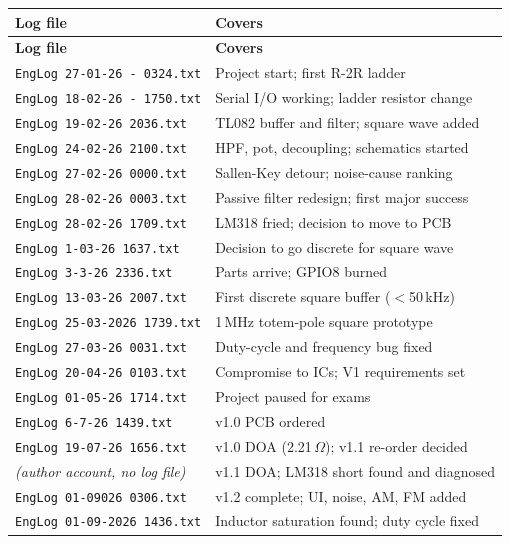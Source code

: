 \documentclass[11pt,a4paper]{article}
\newcommand{\ohm}{\ensuremath{\Omega}}
\begin{document}
\begin{longtable}{@{}ll@{}}
    \toprule
    \rowcolor{accentpale}
    \textbf{\color{accent}Log file}      & \textbf{\color{accent}Covers}                \\
    \midrule
    \endfirsthead
    \toprule
    \rowcolor{accentpale}
    \textbf{\color{accent}Log file}      & \textbf{\color{accent}Covers}                \\
    \midrule
    \endhead
    \texttt{EngLog 27-01-26 - 0324.txt}  & Project start; first R-2R ladder             \\
    \texttt{EngLog 18-02-26 - 1750.txt}  & Serial I/O working; ladder resistor change   \\
    \texttt{EngLog 19-02-26 2036.txt}    & TL082 buffer and filter; square wave added   \\
    \texttt{EngLog 24-02-26 2100.txt}    & HPF, pot, decoupling; schematics started     \\
    \texttt{EngLog 27-02-26 0000.txt}    & Sallen-Key detour; noise-cause ranking       \\
    \texttt{EngLog 28-02-26 0003.txt}    & Passive filter redesign; first major success \\
    \texttt{EngLog 28-02-26 1709.txt}    & LM318 fried; decision to move to PCB         \\
    \texttt{EngLog 1-03-26 1637.txt}     & Decision to go discrete for square wave      \\
    \texttt{EngLog 3-3-26 2336.txt}      & Parts arrive; GPIO8 burned                   \\
    \texttt{EngLog 13-03-26 2007.txt}    & First discrete square buffer ($<$50\,kHz)    \\
    \texttt{EngLog 25-03-2026 1739.txt}  & 1\,MHz totem-pole square prototype           \\
    \texttt{EngLog 27-03-26 0031.txt}    & Duty-cycle and frequency bug fixed           \\
    \texttt{EngLog 20-04-26 0103.txt}    & Compromise to ICs; V1 requirements set       \\
    \texttt{EngLog 01-05-26 1714.txt}    & Project paused for exams                     \\
    \texttt{EngLog 6-7-26 1439.txt}      & v1.0 PCB ordered                             \\
    \texttt{EngLog 19-07-26 1656.txt}    & v1.0 DOA (2.21\,\ohm); v1.1 re-order decided \\
    \emph{(author account, no log file)} & v1.1 DOA; LM318 short found and diagnosed    \\
    \texttt{EngLog 01-09026 0306.txt}    & v1.2 complete; UI, noise, AM, FM added       \\
    \texttt{EngLog 01-09-2026 1436.txt}  & Inductor saturation found; duty cycle fixed  \\
    \bottomrule
\end{longtable}
\end{document}
